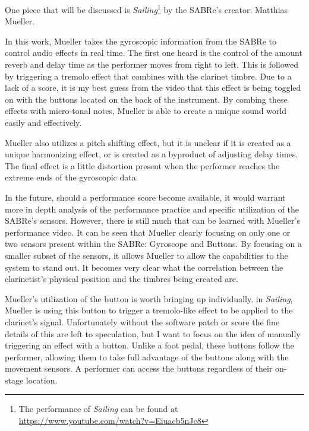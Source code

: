 

One piece that will be discussed is  \textit{Sailing}\footnote{The performance of \textit{Sailing} can be found at \url{https://www.youtube.com/watch?v=Eiuacb5nJc8}} by the SABRe's creator: Matthias Mueller.  

In this work, Mueller takes the gyroscopic information from the SABRe to control audio effects in real time. The first one heard is the control of the amount reverb and delay time as the performer moves from right to left. This is followed by triggering a tremolo effect that combines with the clarinet timbre. Due to a lack of a score, it is my best guess from the video that this effect is being toggled on with the buttons located on the back of the instrument. By combing these effects with micro-tonal notes, Mueller is able to create a unique sound world easily and effectively.

Mueller also utilizes a pitch shifting effect, but it is unclear if it is created as a unique harmonizing effect, or is created as a byproduct of adjusting delay times. The final effect is a little distortion present when the performer reaches the extreme ends of the gyroscopic data.

In the future, should a performance score become available, it would warrant more in depth analysis of the performance practice and specific utilization of the SABRe's sensors. However, there is still much that can be learned with Mueller's performance video. It can be seen that Mueller clearly focusing on only one or two sensors present within the SABRe: Gyroscope and Buttons. By focusing on a smaller subset of the sensors, it allows Mueller to allow the capabilities to the system to stand out. It becomes very clear what the correlation between the clarinetist's physical position and the timbres being created are.

Mueller's utilization of the button is worth bringing up individually. in \textit{Sailing}, Mueller is using this button to trigger a tremolo-like effect to be applied to the clarinet's signal. Unfortunately without the software patch or score the fine details of this are left to speculation, but I want to focus on the idea of manually triggering an effect with a button. Unlike a foot pedal, these buttons follow the performer, allowing them to take full advantage of the buttons along with the movement sensors. A performer can access the buttons regardless of their on-stage location.

